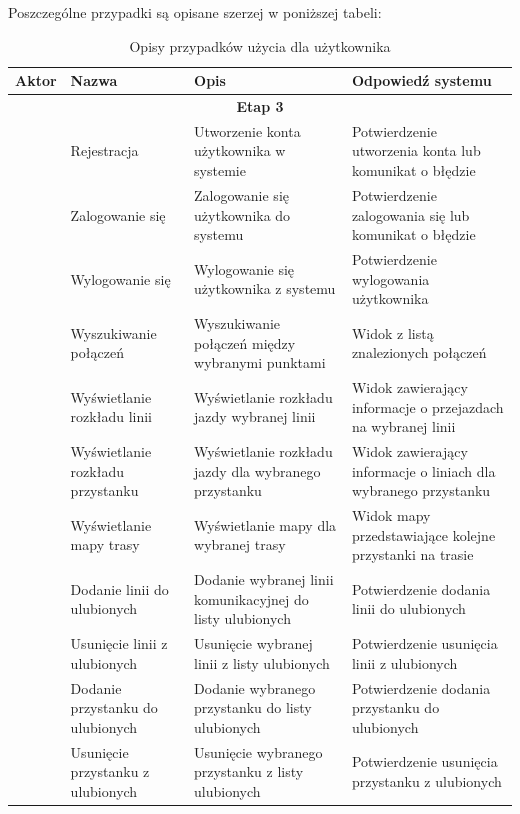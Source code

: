 \documentclass[10pt,a4paper]{article}
\begin{document}
\newpage
\noindent
Poszczególne przypadki są opisane szerzej w poniższej tabeli:
\begin{table}[H]
	\begin{tabularx}{\textwidth}{|c|X|X|X|}
		\hline
		\textbf{Aktor} & \textbf{Nazwa} & \textbf{Opis} & \textbf{Odpowiedź systemu} \\
		\hline
		\multicolumn{4}{|c|}{\textbf{Etap 3}} \\
		\hline
		\multirow{30}{*}{\rotatebox[origin=c]{90}{Użytkownik}}
		& Rejestracja
		& Utworzenie konta użytkownika w systemie
		& Potwierdzenie utworzenia konta lub komunikat o błędzie \\
		\cline{2-4}
		& Zalogowanie się 
		& Zalogowanie się użytkownika do systemu
		& Potwierdzenie zalogowania się lub komunikat o błędzie \\
		\cline{2-4}
		& Wylogowanie się
		& Wylogowanie się użytkownika z systemu
		& Potwierdzenie wylogowania użytkownika \\
		\cline{2-4}
		& Wyszukiwanie połączeń
		& Wyszukiwanie połączeń między wybranymi punktami
		& Widok z listą znalezionych połączeń \\
		\cline{2-4}
		& Wyświetlanie rozkładu linii
		& Wyświetlanie rozkładu jazdy wybranej linii
		& Widok zawierający informacje o przejazdach na wybranej linii \\
		\cline{2-4}
		& Wyświetlanie rozkładu przystanku
		& Wyświetlanie rozkładu jazdy dla wybranego przystanku
		& Widok zawierający informacje o liniach dla wybranego przystanku \\
		\cline{2-4}
		& Wyświetlanie mapy trasy
		& Wyświetlanie mapy dla wybranej trasy
		& Widok mapy przedstawiające kolejne przystanki na trasie \\
		\cline{2-4}
		& Dodanie linii do ulubionych
		& Dodanie wybranej linii komunikacyjnej do listy ulubionych
		& Potwierdzenie dodania linii do ulubionych \\
		\cline{2-4}
		& Usunięcie linii z ulubionych
		& Usunięcie wybranej linii z listy ulubionych
		& Potwierdzenie usunięcia linii z ulubionych \\
		\cline{2-4}
		& Dodanie przystanku do ulubionych
		& Dodanie wybranego przystanku do listy ulubionych
		& Potwierdzenie dodania przystanku do ulubionych \\
		\cline{2-4}
		& Usunięcie przystanku z ulubionych
		& Usunięcie wybranego przystanku z listy ulubionych
		& Potwierdzenie usunięcia przystanku z ulubionych \\
		\hline
	\end{tabularx}
	\caption{Opisy przypadków użycia dla użytkownika}
\end{table}
\end{document}
